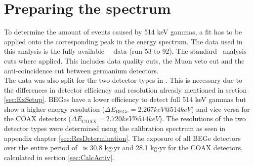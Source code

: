 \documentclass[encoding=utf8,british]{tumphthesis}
\begin{document}

\section{Preparing the spectrum}
\label{sec:prep}

To determine the amount of events caused by 514 keV gammas, a fit has to be applied onto the corresponding peak in the energy spectrum.
The data used in this analysis is the fully available \gerda\ \PII\ data (run 53 to 92).
The standard \gerda\ analysis cuts where applied.
This includes data quality cuts, the Muon veto cut and the anti-coincidence cut between germanium detectors.
\\

The data was also split for the two detector types in \gerda.
This is necessary due to the differences in detector efficiency and resolution already mentioned in section \ref{sec:ExSetup}.
BEGes have a lower efficiency to detect full 514 keV gammas but show a higher energy resolution ($\Delta E_{\mathrm{BEGe}} = 2.267\unit{keV}  @ 514 \unit{keV}$) and vice versa for the COAX detectors ($\Delta E_{\mathrm{COAX}} = 2.720\unit{keV} @ 514 \unit{keV}$).
The resolutions of the two detector types were determined using the calibration spectrum as seen in appendix chapter \ref{sec:ResDetermination}.
The exposure of all BEGe detectors over the entire period of \PII\ is 30.8 kg$\cdot$yr and 28.1 kg$\cdot$yr for the COAX detectors, calculated in section \ref{sec:CalcActiv}.
\\
\end{document}
